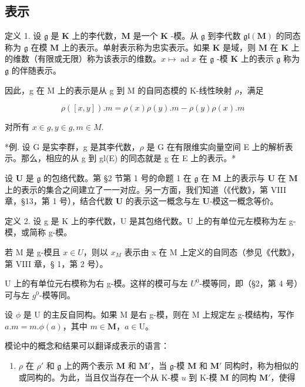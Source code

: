 \subsection{表示}

定义 1. 设 \(\mathfrak{g}\) 是 \(\mathbf{K}\) 上的李代数，\(\mathbf{M}\) 是一个 \(\mathbf{K}\) -模。从 \(\mathfrak{g}\) 到李代数 \(\mathfrak{gl}(\mathbf{M})\) 的同态称为 \(\mathfrak{g}\) 在模 \(\mathbf{M}\) 上的表示。单射表示称为忠实表示。如果 \(\mathbf{K}\) 是域，则 \(\mathbf{M}\) 在 \(\mathbf{K}\) 上的维数（有限或无限）称为该表示的维数。\(x \mapsto \operatorname{ad} x\) 在 \(\mathfrak{g}\) -模 \(\mathbf{K}\) 上的表示 \(\mathfrak{g}\) 称为 \(\mathfrak{g}\) 的伴随表示。

因此，g 在 M 上的表示是从 g 到 M 的自同态模的 K-线性映射 \(\rho\)，满足

\[
\rho ([ x, y ]). m = \rho (x) \rho (y). m - \rho (y) \rho (x). m
\]

对所有 \(x \in g, y \in g, m \in M.\)

*例. 设 G 是实李群，g 是其李代数，\(\rho\) 是 G 在有限维实向量空间 E 上的解析表示。那么，相应的从 g 到 gl(E) 的同态就是 g 在 E 上的表示。*

设 \(\mathbf{U}\) 是 \(\mathfrak{g}\) 的包络代数。第 §2 节第 1 号的命题 1 在 \(\mathfrak{g}\) 在 \(\mathbf{M}\) 上的表示与 \(\mathbf{U}\) 在 \(\mathbf{M}\) 上的表示的集合之间建立了一一对应。另一方面，我们知道（《代数》，第 VIII 章，§13，第 1 号），结合代数 \(\mathbf{U}\) 的表示这一概念与左 \(\mathbf{U}\)-模这一概念等价。

定义 2. 设 g 是 K 上的李代数，U 是其包络代数。U 上的有单位元左模称为左 g-模，或简称 g-模。

若 M 是 g-模且 \(x \in U\)，则以 \(x_{M}\) 表示由 x 在 M 上定义的自同态（参见《代数》，第 VIII 章，§ 1，第 2 号）。

U 上的有单位元右模称为右 g-模。这样的模可与左 \(U^{0}\)-模等同，即（§2，第 4 号）可与左 \(g^{0}\)-模等同。

设 \(\phi\) 是 U 的主反自同构。如果 M 是右 g-模，则在 M 上规定左 g-模结构，写作 \(a.m = m.\phi (a)\)，其中 \(m\in \mathbf{M}\)，\(a\in \mathrm{U}\)。

模论中的概念和结果可以翻译成表示的语言：

\begin{enumerate}
\def\labelenumi{(\arabic{enumi})}
\tightlist
\item
  \(\rho\) 在 \(\rho'\) 和 \(\mathfrak{g}\) 上的两个表示 \(\mathbf{M}\) 和 \(\mathbf{M}'\)，当 \(\mathfrak{g}\)-模 \(\mathbf{M}\) 和 \(\mathbf{M}'\) 同构时，称为相似的或同构的。为此，当且仅当存在一个从 K-模 \(u\) 到 K-模 \(\mathbf{M}\) 的同构 \(\mathbf{M}'\)，使得
\end{enumerate}

